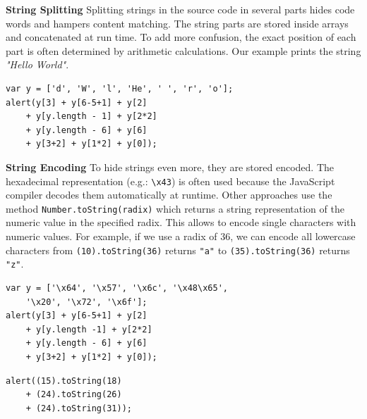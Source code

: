 \begin{itemize}
					\begin{minipage}{\leftside}
						\item \textbf{String Splitting} Splitting strings in the source code in several parts hides code words and hampers content matching. The string parts are stored inside arrays and concatenated at run time. To add more confusion, the exact position of each part is often determined by arithmetic calculations. Our example prints the string \textit{"Hello World"}.
					\end{minipage} \hspace{1em}
					\begin{minipage}{\rightside}	
						\begin{lstlisting}
var y = ['d', 'W', 'l', 'He', ' ', 'r', 'o'];
alert(y[3] + y[6-5+1] + y[2] 
	+ y[y.length - 1] + y[2*2]
	+ y[y.length - 6] + y[6] 
	+ y[3+2] + y[1*2] + y[0]);\end{lstlisting}
					\end{minipage} 	
					
					\begin{minipage}{\leftside}
						\item \textbf{String Encoding} To hide strings even more, they are stored encoded. The hexadecimal representation (e.g.: \texttt{\textbackslash x43}) is often used because the JavaScript compiler decodes them automatically at runtime. Other approaches use the method \texttt{Number.toString(radix)} which returns a string representation of the numeric value in the specified radix. This allows to encode single characters with numeric values. For example, if we use a radix of 36, we can encode all lowercase characters from \texttt{(10).toString(36)} returns \texttt{"a"} to \texttt{(35).toString(36)} returns \texttt{"z"}.
					\end{minipage} \hspace{1em}
					\begin{minipage}{\rightside}	
						\begin{lstlisting}
var y = ['\x64', '\x57', '\x6c', '\x48\x65', 
	'\x20', '\x72', '\x6f'];
alert(y[3] + y[6-5+1] + y[2] 
	+ y[y.length -1] + y[2*2]
	+ y[y.length - 6] + y[6] 
	+ y[3+2] + y[1*2] + y[0]);\end{lstlisting}
						\begin{lstlisting}
alert((15).toString(18) 
	+ (24).toString(26) 
	+ (24).toString(31));\end{lstlisting}
					\end{minipage} 
									

\end{itemize}
